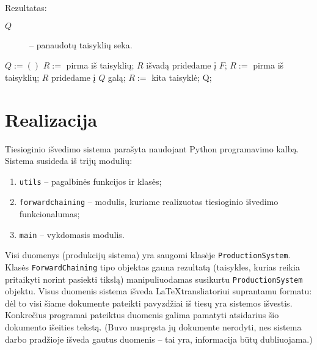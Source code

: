 Rezultatas:
\begin{description}
  \item[$Q$] – panaudotų taisyklių seka.
\end{description}
\begin{algorithmic}[1]
    \State $Q := \left(  \right)$
    \State $R :=$ pirma iš taisyklių;
                                        \label{fc:pseudo:while_condition}
                                        \label{fc:pseudo:if_condition}
        \State $R$ išvadą pridedame į $F$;
                                        \label{fc:pseudo:add_fact}
        \State $R := $ pirma iš taisyklių;
                                        \label{fc:pseudo:start}
        \State $R$ pridedame į $Q$ galą;
                                        \label{fc:pseudo:add_rule}
      \Else
        \State $R := $ kita taisyklė;   \label{fc:pseudo:next_rule}
      \EndIf
    \EndWhile
    \State \Return Q;
  \EndFunction
\end{algorithmic}

\section{Realizacija}

Tiesioginio išvedimo sistema parašyta naudojant Python programavimo
kalbą. Sistema susideda iš trijų modulių:
\begin{enumerate}
  \item \verb|utils| – pagalbinės funkcijos ir klasės;
  \item \verb|forwardchaining| – modulis, kuriame realizuotas
    tiesioginio išvedimo funkcionalumas;
  \item \verb|main| – vykdomasis modulis.
\end{enumerate}

\begin{sloppypar}
Visi duomenys (produkcijų sistema) yra saugomi klasėje
\verb|ProductionSystem|. Klasės \verb|ForwardChaining| tipo objektas
gauna rezultatą (taisykles, kurias reikia pritaikyti norint pasiekti
tikslą) manipuliuodamas susikurtu \verb|ProductionSystem| objektu.
Visus duomenis sistema išveda \LaTeX transliatoriui suprantamu formatu:
dėl to visi šiame dokumente pateikti pavyzdžiai iš tiesų yra
sistemos išvestis. Konkrečius programai pateiktus duomenis
galima pamatyti atsidarius šio dokumento išeities tekstą. (Buvo
nuspręsta jų dokumente nerodyti, nes sistema darbo pradžioje išveda
gautus duomenis – tai yra, informacija būtų dubliuojama.)
\end{sloppypar}

